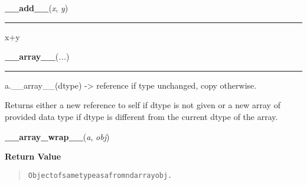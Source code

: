     \label{numpy:ndarray:__add__}

    \vspace{0.5ex}

    \begin{boxedminipage}{\textwidth}

    \raggedright \textbf{\_\_add\_\_}(\textit{x}, \textit{y})

    \vspace{-1.5ex}

    \rule{\textwidth}{0.5\fboxrule}

x+y
    \vspace{1ex}

    \end{boxedminipage}

    \label{numpy:ndarray:__array__}

    \vspace{0.5ex}

    \begin{boxedminipage}{\textwidth}

    \raggedright \textbf{\_\_array\_\_}(\textit{...})

    \vspace{-1.5ex}

    \rule{\textwidth}{0.5\fboxrule}

a.{\_}{\_}array{\_}{\_}({\color{red}\bfseries{}{\textbar}}dtype) -{\textgreater} reference if type unchanged, copy otherwise.

Returns either a new reference to self if dtype is not given or a new array
of provided data type if dtype is different from the current dtype of the
array.
    \vspace{1ex}

    \end{boxedminipage}

    \label{numpy:ndarray:__array_wrap__}

    \vspace{0.5ex}

    \begin{boxedminipage}{\textwidth}

    \raggedright \textbf{\_\_array\_wrap\_\_}(\textit{a}, \textit{obj})

      \textbf{Return Value}
      \begin{quote}
\begin{alltt}
Object of same type as a from ndarray obj.
\end{alltt}

      \end{quote}

    \vspace{1ex}

    \end{boxedminipage}

